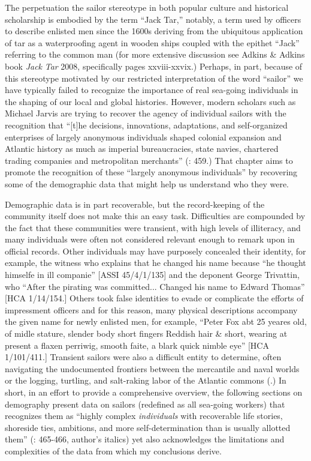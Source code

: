   The perpetuation the sailor stereotype in both popular culture and historical scholarship is embodied by the term “Jack Tar,” notably, a term used by officers to describe enlisted men since the 1600s deriving from the ubiquitous application of tar as a waterproofing agent in wooden ships coupled with the epithet “Jack” referring to the common man (for more extensive discussion see Adkins \& Adkins book \textit{Jack} \textit{Tar} 2008, specifically pages xxviii-xxvix.) Perhaps, in part, because of this stereotype motivated by our restricted interpretation of the word “sailor” we have typically failed to recognize the importance of real sea-going individuals in the shaping of our local and global histories. However, modern scholars such as Michael Jarvis are trying to recover the agency of individual sailors with the recognition that “[t]he decisions, innovations, adaptations, and self-organized enterprises of largely anonymous individuals shaped colonial expansion and Atlantic history as much as imperial bureaucracies, state navies, chartered trading companies and metropolitan merchants” (\citealt{Jarvis2010}: 459.) That chapter aims to promote the recognition of these “largely anonymous individuals” by recovering some of the demographic data that might help us understand who they were. 

Demographic data is in part recoverable, but the record-keeping of the community itself does not make this an easy task. Difficulties are compounded by the fact that these communities were transient, with high levels of illiteracy, and many individuals were often not considered relevant enough to remark upon in official records. Other individuals may have purposely concealed their identity, for example, the witness who explains that he changed his name because “he thought himselfe in ill companie” [ASSI 45/4/1/135] and the deponent George Trivattin, who “After the pirating was committed... Changed his name to Edward Thomas” [HCA 1/14/154.] Others took false identities to evade or complicate the efforts of impressment officers and for this reason, many physical descriptions accompany the given name for newly enlisted men, for example, “Peter Fox abt 25 yeares old, of midle stature, slender body short fingers Reddish hair \& short, wearing at present a flaxen perriwig, smooth faite, a blark quick nimble eye” [HCA 1/101/411.] Transient sailors were also a difficult entity to determine, often navigating the undocumented frontiers between the mercantile and naval worlds \citep{Fusaro2015} or the logging, turtling, and salt-raking labor of the Atlantic commons (\citealt{Jarvis2010}.) In short, in an effort to provide a comprehensive overview, the following sections on demography present data on sailors (redefined as all sea-going workers) that recognizes them as “highly complex \textit{individuals} with recoverable life stories, shoreside ties, ambitions, and more self-determination than is usually allotted them” (\citealt{Jarvis2010}: 465-466, author’s italics) yet also acknowledges the limitations and complexities of the data from which my conclusions derive. 

